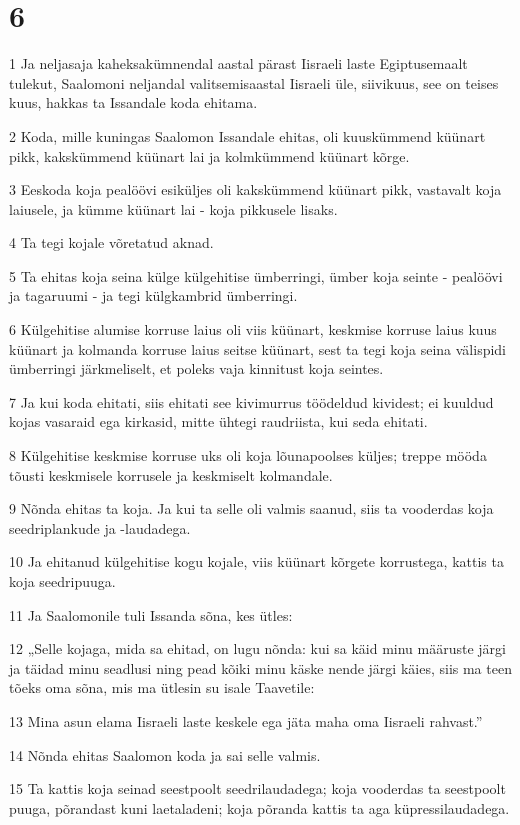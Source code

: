 \chapter{6}

\par 1 Ja neljasaja kaheksakümnendal aastal pärast Iisraeli laste Egiptusemaalt tulekut, Saalomoni neljandal valitsemisaastal Iisraeli üle, siivikuus, see on teises kuus, hakkas ta Issandale koda ehitama.
\par 2 Koda, mille kuningas Saalomon Issandale ehitas, oli kuuskümmend küünart pikk, kakskümmend küünart lai ja kolmkümmend küünart kõrge.
\par 3 Eeskoda koja pealöövi esiküljes oli kakskümmend küünart pikk, vastavalt koja laiusele, ja kümme küünart lai - koja pikkusele lisaks.
\par 4 Ta tegi kojale võretatud aknad.
\par 5 Ta ehitas koja seina külge külgehitise ümberringi, ümber koja seinte - pealöövi ja tagaruumi - ja tegi külgkambrid ümberringi.
\par 6 Külgehitise alumise korruse laius oli viis küünart, keskmise korruse laius kuus küünart ja kolmanda korruse laius seitse küünart, sest ta tegi koja seina välispidi ümberringi järkmeliselt, et poleks vaja kinnitust koja seintes.
\par 7 Ja kui koda ehitati, siis ehitati see kivimurrus töödeldud kividest; ei kuuldud kojas vasaraid ega kirkasid, mitte ühtegi raudriista, kui seda ehitati.
\par 8 Külgehitise keskmise korruse uks oli koja lõunapoolses küljes; treppe mööda tõusti keskmisele korrusele ja keskmiselt kolmandale.
\par 9 Nõnda ehitas ta koja. Ja kui ta selle oli valmis saanud, siis ta vooderdas koja seedriplankude ja -laudadega.
\par 10 Ja ehitanud külgehitise kogu kojale, viis küünart kõrgete korrustega, kattis ta koja seedripuuga.
\par 11 Ja Saalomonile tuli Issanda sõna, kes ütles:
\par 12 „Selle kojaga, mida sa ehitad, on lugu nõnda: kui sa käid minu määruste järgi ja täidad minu seadlusi ning pead kõiki minu käske nende järgi käies, siis ma teen tõeks oma sõna, mis ma ütlesin su isale Taavetile:
\par 13 Mina asun elama Iisraeli laste keskele ega jäta maha oma Iisraeli rahvast.”
\par 14 Nõnda ehitas Saalomon koda ja sai selle valmis.
\par 15 Ta kattis koja seinad seestpoolt seedrilaudadega; koja vooderdas ta seestpoolt puuga, põrandast kuni laetaladeni; koja põranda kattis ta aga küpressilaudadega.
